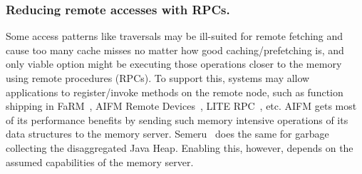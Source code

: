 
\subsubsection{Reducing remote accesses with RPCs.}
Some access patterns like traversals may be ill-suited for remote 
fetching and cause too many cache misses no matter how good 
caching/prefetching is, and only viable option might be 
executing those operations closer to the memory using remote 
procedures (RPCs). 
To support this, systems may allow applications to register/invoke 
methods on the remote node, such as function shipping in 
FaRM~\cite{farm}, AIFM Remote Devices~\cite{aifm}, 
LITE RPC~\cite{literdma}, etc.
AIFM gets most of its performance benefits 
by sending such memory intensive operations of its data 
structures to the memory server. 
Semeru~\cite{semeru} does the same for 
garbage collecting the disaggregated Java Heap. Enabling this, 
however, depends on the assumed capabilities of the memory server.

